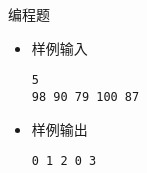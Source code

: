 \begin{frame}[fragile]
{{\begin{exampleblock}{编程题}
\begin{itemize}
                    \item 样例输入

                        \lstinline|5|\\
                        \lstinline|98 90 79 100 87|

                    \item 样例输出

                        \lstinline|0 1 2 0 3|

                \end{itemize}

            \end{exampleblock}
        }
    }
\end{frame}

